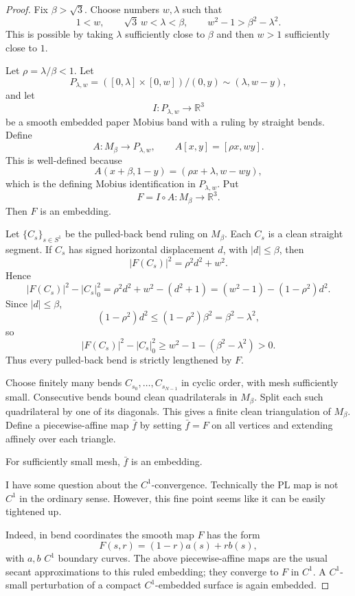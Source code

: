 \documentclass[12pt]{article}
\newcommand{\R}{\mathbb R}
\newcommand{\review}[1]{\begin{reviewbox}#1\end{reviewbox}}
\begin{document}
\begin{proof}
Fix \(\beta>\sqrt3\).  Choose numbers \(w,\lambda\) such that
\[
1<w,\qquad \sqrt3\,w<\lambda<\beta,\qquad
w^2-1>\beta^2-\lambda^2.
\]
This is possible by taking \(\lambda\) sufficiently close to \(\beta\) and then \(w>1\) sufficiently close to \(1\).

Let \(\rho=\lambda/\beta<1\).  Let
\[
P_{\lambda,w}=([0,\lambda]\times[0,w])/(0,y)\sim(\lambda,w-y),
\]
and let
\[
I:P_{\lambda,w}\longrightarrow \R^3
\]
be a smooth embedded paper Mobius band with a ruling by straight bends.  Define
\[
A:M_\beta\longrightarrow P_{\lambda,w},\qquad A[x,y]=[\rho x,wy].
\]
This is well-defined because
\[
A(x+\beta,1-y)=(\rho x+\lambda,w-wy),
\]
which is the defining Mobius identification in \(P_{\lambda,w}\).  Put
\[
F=I\circ A:M_\beta\longrightarrow \R^3.
\]
Then \(F\) is an embedding.

Let \(\{C_s\}_{s\in S^1}\) be the pulled-back bend ruling on \(M_\beta\).  Each \(C_s\) is a clean straight segment.  If \(C_s\) has signed horizontal displacement \(d\), with \(|d|\le \beta\), then
\[
|F(C_s)|^2=\rho^2d^2+w^2.
\]
Hence
\[
|F(C_s)|^2-|C_s|_0^2
=\rho^2d^2+w^2-(d^2+1)
=(w^2-1)-(1-\rho^2)d^2.
\]
Since \(|d|\le\beta\),
\[
(1-\rho^2)d^2\le (1-\rho^2)\beta^2=\beta^2-\lambda^2,
\]
so
\[
|F(C_s)|^2-|C_s|_0^2\ge w^2-1-(\beta^2-\lambda^2)>0. \tag{3}
\]
Thus every pulled-back bend is strictly lengthened by \(F\).

Choose finitely many bends \(C_{s_0},\dots,C_{s_{N-1}}\) in cyclic order, with mesh sufficiently small.  Consecutive bends bound clean quadrilaterals in \(M_\beta\).  Split each such quadrilateral by one of its diagonals.  This gives a finite clean triangulation of \(M_\beta\).  Define a piecewise-affine map \(\bar f\) by setting \(\bar f=F\) on all vertices and extending affinely over each triangle.

For sufficiently small mesh, \(\bar f\) is an embedding. 

\review{I have some question about the $C^1$-convergence.  Technically the PL map is not $C^1$ in the ordinary sense. However, this fine point seems like it can be easily tightened up.}


Indeed, in bend coordinates the smooth map \(F\) has the form
\[
F(s,r)=(1-r)a(s)+r b(s),
\]
with \(a,b\) \(C^1\) boundary curves.  The above piecewise-affine maps are the usual secant approximations to this ruled embedding; they converge to \(F\) in \(C^1\).  A \(C^1\)-small perturbation of a compact \(C^1\)-embedded surface is again embedded.


\end{proof}
\end{document}
